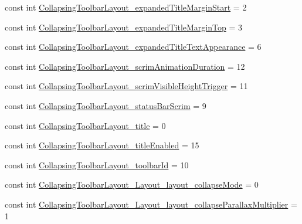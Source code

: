 \begin{DoxyCompactItemize}
\item 
const int \mbox{\hyperlink{class_f_w_p_s___app_1_1_droid_1_1_resource_1_1_styleable_a949a187164ac40f8e043320be212de30}{Collapsing\+Toolbar\+Layout\+\_\+expanded\+Title\+Margin\+Start}} = 2
\item 
const int \mbox{\hyperlink{class_f_w_p_s___app_1_1_droid_1_1_resource_1_1_styleable_a29bafbc576c211333ef34a9fa984a049}{Collapsing\+Toolbar\+Layout\+\_\+expanded\+Title\+Margin\+Top}} = 3
\item 
const int \mbox{\hyperlink{class_f_w_p_s___app_1_1_droid_1_1_resource_1_1_styleable_ac6e77d68d26ca3727b8665aa64c3d59e}{Collapsing\+Toolbar\+Layout\+\_\+expanded\+Title\+Text\+Appearance}} = 6
\item 
const int \mbox{\hyperlink{class_f_w_p_s___app_1_1_droid_1_1_resource_1_1_styleable_a361136fb58700f2168e971d1ab14a2ca}{Collapsing\+Toolbar\+Layout\+\_\+scrim\+Animation\+Duration}} = 12
\item 
const int \mbox{\hyperlink{class_f_w_p_s___app_1_1_droid_1_1_resource_1_1_styleable_a0820575fbabe72652fd8abf3219a46e0}{Collapsing\+Toolbar\+Layout\+\_\+scrim\+Visible\+Height\+Trigger}} = 11
\item 
const int \mbox{\hyperlink{class_f_w_p_s___app_1_1_droid_1_1_resource_1_1_styleable_a59ae722a4d7193ee334ca36e011b7795}{Collapsing\+Toolbar\+Layout\+\_\+status\+Bar\+Scrim}} = 9
\item 
const int \mbox{\hyperlink{class_f_w_p_s___app_1_1_droid_1_1_resource_1_1_styleable_a78d65d0490af206d365a4b8fc1c7a279}{Collapsing\+Toolbar\+Layout\+\_\+title}} = 0
\item 
const int \mbox{\hyperlink{class_f_w_p_s___app_1_1_droid_1_1_resource_1_1_styleable_ac553e36f322ef5a884ec60fdf26183fd}{Collapsing\+Toolbar\+Layout\+\_\+title\+Enabled}} = 15
\item 
const int \mbox{\hyperlink{class_f_w_p_s___app_1_1_droid_1_1_resource_1_1_styleable_a8dbfbac9fabd6c73c1e05043e25cb299}{Collapsing\+Toolbar\+Layout\+\_\+toolbar\+Id}} = 10
\item 
const int \mbox{\hyperlink{class_f_w_p_s___app_1_1_droid_1_1_resource_1_1_styleable_a8c318fa471ba45083b849d29c3827282}{Collapsing\+Toolbar\+Layout\+\_\+\+Layout\+\_\+layout\+\_\+collapse\+Mode}} = 0
\item 
const int \mbox{\hyperlink{class_f_w_p_s___app_1_1_droid_1_1_resource_1_1_styleable_a00f5904552e0e03a4a9001a9958d1117}{Collapsing\+Toolbar\+Layout\+\_\+\+Layout\+\_\+layout\+\_\+collapse\+Parallax\+Multiplier}} = 1
\item 

\end{DoxyCompactItemize}
